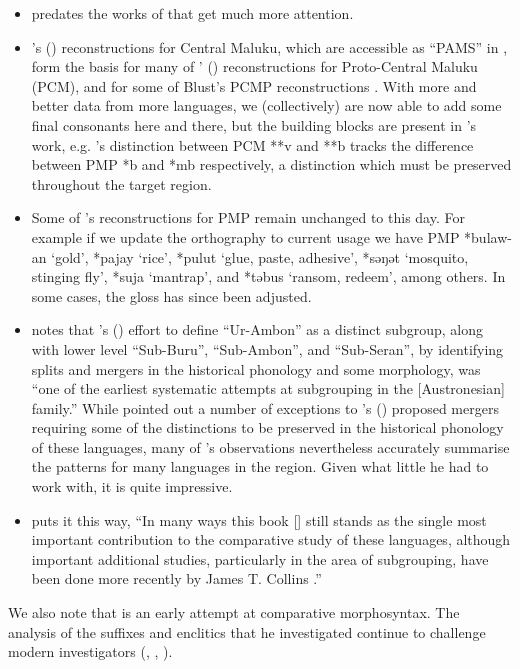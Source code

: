 {\begin{itemize}
	\item \citet{Stresemann1927} predates the works of
				\citet{Dempwolff1934,Dempwolff1937,Dempwolff1938} that get much more attention.
	\item \citeauthor{Stresemann1927}'s (\citeyear{Stresemann1927})
				reconstructions for Central Maluku, which are
				accessible as “PAMS” in \citet{WurmWilson1983},
				form the basis for many of \citeauthor{Collins1983}' (\citeyear{Collins1983})
				reconstructions for Proto-Central Maluku (PCM),
				and for some of Blust’s PCMP reconstructions \citet{BlustTrussel2020}.
				With more and better data from more languages,
				we (collectively) are now able to add some final consonants here
				and there, but the building blocks are present in \citeauthor{Stresemann1927}’s work,
				e.g. \citeauthor{Stresemann1927}’s distinction between PCM **v
				and **b tracks the difference between PMP *b
				and *mb respectively,
				a distinction which must be preserved throughout the target region.
	\item Some of \citet{Stresemann1927}'s reconstructions for PMP
				remain unchanged to this day.
				For example if we update the orthography to current usage we have PMP *bulaw-an ‘gold’,
				*pajay ‘rice’, *pulut ‘glue, paste, adhesive’,
				*səŋət ‘mosquito, stinging fly’, *suja ‘mantrap’, and *təbus ‘ransom, redeem’, among others.
				In some cases, the gloss has since been adjusted.
	\item \citet[4]{Collins1983} notes that \citeauthor{Stresemann1927}'s (\citeyear{Stresemann1927})
				effort to define “Ur-Ambon” as a distinct subgroup,
				along with lower level “Sub-Buru”, “Sub-Ambon”, and “Sub-Seran”,
				by identifying splits and mergers in the historical phonology
				and some morphology,
				was “one of the earliest systematic attempts at subgrouping in the [Austronesian] family.”
				While \citet{Collins1983} pointed out a number of exceptions
				to \citeauthor{Stresemann1927}'s (\citeyear{Stresemann1927}) proposed mergers requiring
				some of the distinctions to be preserved in the historical phonology of these languages,
				many of \citeauthor{Stresemann1927}’s observations nevertheless accurately
				summarise the patterns for many languages in the region.
				Given what little he had to work with,
				it is quite impressive.
	\item \citet[90]{Blust2013} puts it this way,
				“In many ways this book [\cite{Stresemann1927}] still
				stands as the single most important contribution
				to the comparative study of these languages,
				although important additional studies,
				particularly in the area of subgrouping,
				have been done more recently by James T.
				Collins \citep{Collins1982d,Collins1983}.”
\end{itemize}

We also note that \citet{Jonker1906} is an early attempt at comparative morphosyntax.
The analysis of the suffixes and enclitics that he investigated continue
to challenge modern investigators
(\citealp[vi]{Fox1968}, \citealp[30--33]{Collins1983}, \citealp{Grimes1991b}).}
